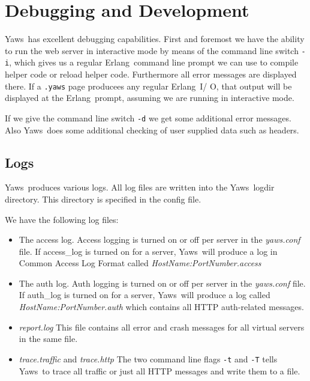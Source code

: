 \documentclass[11pt,oneside,english]{book}
\newcommand{\Erlang}            %
        {{\sc Erlang}}
\newcommand{\Yaws}            %
        {{\sc Yaws}}
\begin{document}
\chapter{Debugging and Development}

\Yaws\ has excellent debugging capabilities. First and foremost we
have the ability to run the web server in interactive mode by means of
the command line switch \verb+-i+, which gives us a regular
\Erlang\ command line prompt we can use to compile helper code or
reload helper code. Furthermore all error messages are displayed
there.  If a \verb+.yaws+ page producees any regular \Erlang\ I\slash
O, that output will be displayed at the \Erlang\ prompt, assuming we
are running in interactive mode.

If we give the command line switch \verb+-d+ we get some additional
error messages. Also \Yaws\ does some additional checking of user
supplied data such as headers.

\section{Logs}
\Yaws\ produces various logs. All log files are written into the
\Yaws\ logdir directory. This directory is specified in the config
file.

We have the following log files:

\begin{itemize}
\item The access log. Access logging is turned on or off per server in
  the \textit{yaws.conf} file. If access\_log is turned on for a
  server, \Yaws\ will produce a log in Common Access Log Format called
  \textit{HostName:PortNumber.access}

\item The auth log. Auth logging is turned on or off per server in the
  \textit{yaws.conf} file. If auth\_log is turned on for a server,
  \Yaws\ will produce a log called \textit{HostName:PortNumber.auth}
  which contains all HTTP auth-related messages.

\item \textit{report.log} This file contains all error and crash
  messages for all virtual servers in the same file.

\item \textit{trace.traffic} and \textit{trace.http} The two command
  line flags \verb+-t+ and \verb+-T+ tells \Yaws\ to trace all traffic
  or just all HTTP messages and write them to a file.
\end{itemize}
\end{document}
